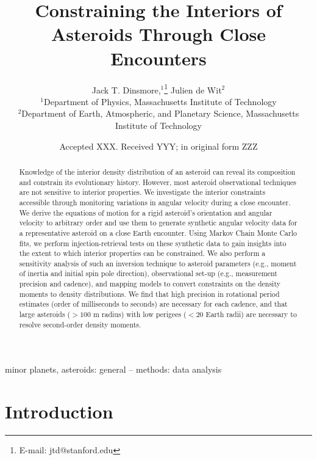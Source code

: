 \documentclass[fleqn,usenatbib]{mnras}
\title[Flyby Constraints on Asteroids Interiors]{Constraining the Interiors of Asteroids Through Close Encounters}
\author[Jack T. Dinsmore, Julien de Wit]{
Jack T. Dinsmore,$^{1}$\thanks{E-mail: jtd@stanford.edu}
Julien de Wit$^{2}$
\\
$^{1}$Department of Physics, Massachusetts Institute of Technology\\
$^{2}$Department of Earth, Atmospheric, and Planetary Science, Massachusetts Institute of Technology
}
\date{Accepted XXX. Received YYY; in original form ZZZ}
\begin{document}
\label{firstpage}
\pagerange{\pageref{firstpage}--\pageref{lastpage}}
\maketitle

\begin{abstract}
  Knowledge of the interior density distribution of an asteroid can reveal its composition and constrain its evolutionary history. However, most asteroid observational techniques are not sensitive to interior properties. We investigate the interior constraints accessible through monitoring variations in angular velocity during a close encounter. We derive the equations of motion for a rigid asteroid's orientation and angular velocity to arbitrary order and use them to generate synthetic angular velocity data for a representative asteroid on a close Earth encounter. Using Markov Chain Monte Carlo fits, we perform injection-retrieval tests on these synthetic data to gain insights into the extent to which interior properties can be constrained. We also perform a sensitivity analysis of such an inversion technique to asteroid parameters (e.g., moment of inertia and initial spin pole direction), observational set-up (e.g., measurement precision and cadence), and mapping models to convert constraints on the density moments to density distributions. We find that high precision in rotational period estimates (order of milliseconds to seconds) are necessary for each cadence, and that large asteroids ($> 100$ m radius) with low perigees ($<20$ Earth radii) are necessary to resolve second-order density moments.
\end{abstract}

\begin{keywords}
  minor planets, asteroids: general -- methods: data analysis
\end{keywords}



\section{Introduction}
\end{document}
